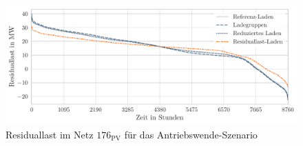 \begin{figure}[H]
    \centering
    \includegraphics[width=1\textwidth]{Bilder/example_resiual_load}
    \caption[Residuallast im Netz \num{176} für das Antriebswende-Szenario]{Residuallast im Netz \(176_{\text{PV}}\) für das Antriebswende-Szenario}\label{fig:residual_load}
\end{figure}